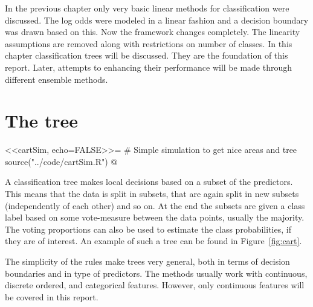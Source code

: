 %
In the previous chapter only very basic linear methods for classification were discussed. The log odds were modeled in a linear fashion and a decision boundary was drawn based on this. Now the framework changes completely. The linearity assumptions are removed along with restrictions on number of classes. 
In this chapter classification trees will be discussed. They are the foundation of this report. Later, attempts to enhancing their performance will be made through different ensemble methods. 

\section{The tree}
\label{sec:Tree}
<<cartSim, echo=FALSE>>=
# Simple simulation to get nice areas and tree
source("../code/cartSim.R")
@

A classification tree makes local decisions based on a subset of the predictors. This means that the data is split in subsets, that are again split in new subsets (independently of each other) and so on. 
At the end the subsets are given a class label based on some vote-measure between the data points, usually the majority.
The voting proportions can also be used to estimate the class probabilities, if they are of interest.
An example of such a tree can be found in Figure~\ref{fig:cart}.

The simplicity of the rules make trees very general, both in terms of decision boundaries and in type of predictors. The methods usually work with continuous, discrete ordered, and categorical features. However, only continuous features will be covered in this report.  

